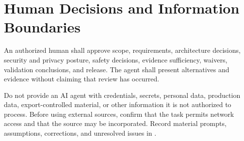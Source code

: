 \section{Human Decisions and Information Boundaries}
An authorized human shall approve scope, requirements, architecture decisions,
security and privacy posture, safety decisions, evidence sufficiency, waivers,
validation conclusions, and release. The agent shall present alternatives and
evidence without claiming that review has occurred.

Do not provide an AI agent with credentials, secrets, personal data,
production data, export-controlled material, or other information it is not
authorized to process. Before using external sources, confirm that the task
permits network access and that the source may be incorporated. Record material
prompts, assumptions, corrections, and unresolved issues in
.

